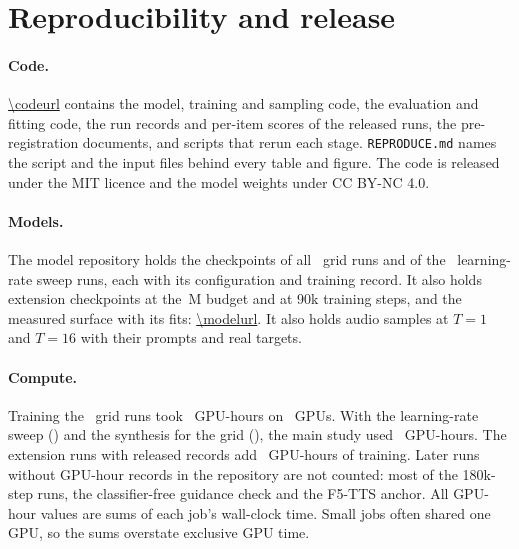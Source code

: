 \section{Reproducibility and release}
\label{app:repro}
\paragraph{Code.} \url{\codeurl} contains the model, training and sampling code, the
evaluation and fitting code, the run records and per-item scores of the released runs, the
pre-registration documents, and scripts that rerun each stage. \texttt{REPRODUCE.md} names
the script and the input files behind every table and figure. The code is released under the
MIT licence and the model weights under CC BY-NC 4.0.

\paragraph{Models.} The model repository holds the checkpoints of all \NcrrGridRuns\ grid
runs and of the \NcrrSweepRuns\ learning-rate sweep runs, each with its configuration and
training record. It also holds extension checkpoints at the \NmaxNfour\,M budget and at 90k
training steps, and the measured surface with its fits: \url{\modelurl}. It also holds audio
samples at $T{=}1$ and $T{=}16$ with their prompts and real targets.

\paragraph{Compute.} Training the \NcrrGridRuns\ grid runs took \NcrrGridTrainGpuh\
GPU-hours on \NcrrDevice\ GPUs. With the learning-rate sweep (\NcrrSweepGpuh) and the
synthesis for the grid (\NcrrGridSynthGpuh), the main study used \NcrrMainGpuh\ GPU-hours.
The extension runs with released records add \NcrrExtTrainGpuh\ GPU-hours of training.
Later runs without GPU-hour records in the repository are not counted: most of the
180k-step runs, the classifier-free guidance check and the F5-TTS anchor. All GPU-hour values
are sums of each job's wall-clock time. Small jobs often shared one GPU, so the sums overstate
exclusive GPU time.

